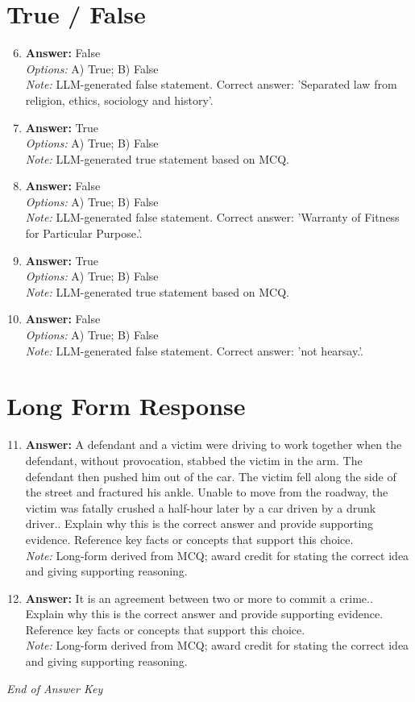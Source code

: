 \documentclass[12pt]{article}
\begin{document}
\section*{True / False}
\begin{enumerate}[label=\arabic*.]
\setcounter{enumi}{5}
\item \textbf{Answer:} False
\\ \textit{Options:} A) True; B) False
\\ \textit{Note:} LLM-generated false statement. Correct answer: 'Separated law from religion, ethics, sociology and history'.
\item \textbf{Answer:} True
\\ \textit{Options:} A) True; B) False
\\ \textit{Note:} LLM-generated true statement based on MCQ.
\item \textbf{Answer:} False
\\ \textit{Options:} A) True; B) False
\\ \textit{Note:} LLM-generated false statement. Correct answer: 'Warranty of Fitness for Particular Purpose.'.
\item \textbf{Answer:} True
\\ \textit{Options:} A) True; B) False
\\ \textit{Note:} LLM-generated true statement based on MCQ.
\item \textbf{Answer:} False
\\ \textit{Options:} A) True; B) False
\\ \textit{Note:} LLM-generated false statement. Correct answer: 'not hearsay.'.
\end{enumerate}

\section*{Long Form Response}
\begin{enumerate}[label=\arabic*.]
\setcounter{enumi}{10}
\item \textbf{Answer:} A defendant and a victim were driving to work together when the defendant, without provocation, stabbed the victim in the arm. The defendant then pushed him out of the car. The victim fell along the side of the street and fractured his ankle. Unable to move from the roadway, the victim was fatally crushed a half-hour later by a car driven by a drunk driver.. Explain why this is the correct answer and provide supporting evidence. Reference key facts or concepts that support this choice.
\\ \textit{Note:} Long-form derived from MCQ; award credit for stating the correct idea and giving supporting reasoning.
\item \textbf{Answer:} It is an agreement between two or more to commit a crime.. Explain why this is the correct answer and provide supporting evidence. Reference key facts or concepts that support this choice.
\\ \textit{Note:} Long-form derived from MCQ; award credit for stating the correct idea and giving supporting reasoning.
\end{enumerate}

\vfill
\noindent\textit{End of Answer Key}
\end{document}
